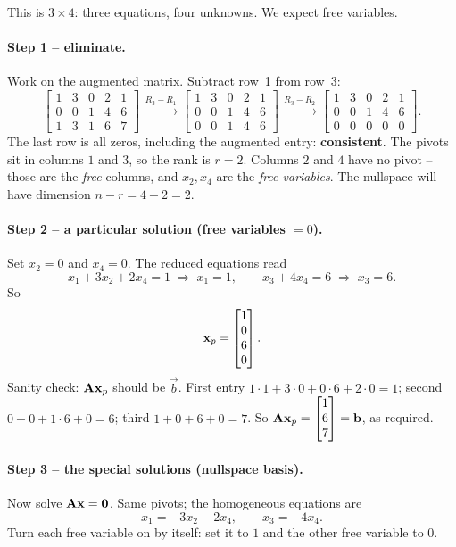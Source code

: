 This is $3\times4$: three equations, four unknowns. We expect free variables.

\paragraph{Step 1 -- eliminate.} Work on the augmented matrix. Subtract row~1 from row~3:
\[
  \left[\begin{array}{cccc|c}
    1&3&0&2&1\\ 0&0&1&4&6\\ 1&3&1&6&7
  \end{array}\right]
  \xrightarrow{\,R_3-R_1\,}
  \left[\begin{array}{cccc|c}
    1&3&0&2&1\\ 0&0&1&4&6\\ 0&0&1&4&6
  \end{array}\right]
  \xrightarrow{\,R_3-R_2\,}
  \left[\begin{array}{cccc|c}
    1&3&0&2&1\\ 0&0&1&4&6\\ 0&0&0&0&0
  \end{array}\right].
\]
The last row is all zeros, including the augmented entry: \textbf{consistent}. The pivots
sit in columns $1$ and $3$, so the rank is $r=2$. Columns $2$ and $4$ have no pivot --
those are the \emph{free} columns, and $x_2,x_4$ are the \emph{free variables}. The
nullspace will have dimension $n-r=4-2=2$.

\paragraph{Step 2 -- a particular solution (free variables $=0$).} Set $x_2=0$ and
$x_4=0$. The reduced equations read
\[
  x_1+3x_2+2x_4 = 1 \;\Rightarrow\; x_1=1,\qquad
  x_3+4x_4 = 6 \;\Rightarrow\; x_3=6.
\]
So
\[
  \mathbf{x}_p=\begin{bmatrix}1\\0\\6\\0\end{bmatrix}.
\]
Sanity check: $\mathbf{A}\mathbf{x}_p$ should be $\vec{b}$. First entry
$1\cdot1+3\cdot0+0\cdot6+2\cdot0=1$; second $0+0+1\cdot6+0=6$; third
$1+0+6+0=7$. So $\mathbf{A}\mathbf{x}_p=\begin{bmatrix}1\\6\\7\end{bmatrix}=\mathbf{b}$, as required.

\paragraph{Step 3 -- the special solutions (nullspace basis).} Now solve
$\mathbf{A}\mathbf{x}=\mathbf{0}$. Same pivots; the homogeneous equations are
\[
  x_1=-3x_2-2x_4,\qquad x_3=-4x_4.
\]
Turn each free variable on by itself: set it to $1$ and the other free variable to $0$.

